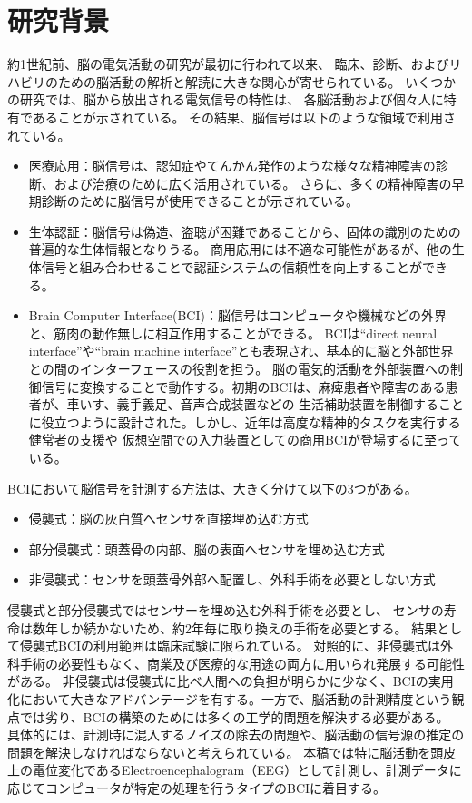 \section{研究背景}

約1世紀前、脳の電気活動の研究が最初に行われて以来、
臨床、診断、およびリハビリのための脳活動の解析と解読に大きな関心が寄せられている。
いくつかの研究では、脳から放出される電気信号の特性は、
各脳活動および個々人に特有であることが示されている。
その結果、脳信号は以下のような領域で利用されている。
\begin{itemize}
    \item 医療応用：脳信号は、認知症やてんかん発作のような様々な精神障害の診断、および治療のために広く活用されている。
    さらに、多くの精神障害の早期診断のために脳信号が使用できることが示されている。
    \item 生体認証：脳信号は偽造、盗聴が困難であることから、固体の識別のための普遍的な生体情報となりうる。
    商用応用には不適な可能性があるが、他の生体信号と組み合わせることで認証システムの信頼性を向上することができる。
    \item Brain Computer Interface(BCI)：脳信号はコンピュータや機械などの外界と、筋肉の動作無しに相互作用することができる。
    BCIは``direct neural interface''や``brain machine interface''とも表現され、基本的に脳と外部世界との間のインターフェースの役割を担う。
    脳の電気的活動を外部装置への制御信号に変換することで動作する。初期のBCIは、麻痺患者や障害のある患者が、車いす、義手義足、音声合成装置などの
    生活補助装置を制御することに役立つように設計された。しかし、近年は高度な精神的タスクを実行する健常者の支援や
    仮想空間での入力装置としての商用BCIが登場するに至っている。
\end{itemize}
BCIにおいて脳信号を計測する方法は、大きく分けて以下の3つがある。
\begin{itemize}
    \item 侵襲式：脳の灰白質へセンサを直接埋め込む方式
    \item 部分侵襲式：頭蓋骨の内部、脳の表面へセンサを埋め込む方式
    \item 非侵襲式：センサを頭蓋骨外部へ配置し、外科手術を必要としない方式
\end{itemize}
侵襲式と部分侵襲式ではセンサーを埋め込む外科手術を必要とし、
センサの寿命は数年しか続かないため、約2年毎に取り換えの手術を必要とする。
結果として侵襲式BCIの利用範囲は臨床試験に限られている。
対照的に、非侵襲式は外科手術の必要性もなく、商業及び医療的な用途の両方に用いられ発展する可能性がある。
非侵襲式は侵襲式に比べ人間への負担が明らかに少なく、BCIの実用化において大きなアドバンテージを有する。一方で、脳活動の計測精度という観点では劣り、BCIの構築のためには多くの工学的問題を解決する必要がある。
具体的には、計測時に混入するノイズの除去の問題や、脳活動の信号源の推定の問題を解決しなければならないと考えられている。
本稿では特に脳活動を頭皮上の電位変化であるElectroencephalogram（EEG）として計測し、計測データに応じてコンピュータが特定の処理を行うタイプのBCIに着目する。


